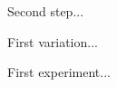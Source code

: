 \begin{preparation}
\item 
\item Second step...
\end{preparation}


\begin{variation}
\item First variation...
\end{variation}


\begin{experiments}
\item First experiment...
\end{experiments}


\recipeend
